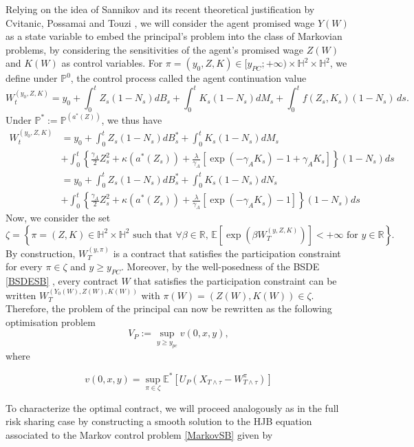 \documentclass[numbook, envcountsect, envcountsame, envcountreset, runningheads, smallextended]{article}
\def \E{\mathbb{E}}
\def \P{\mathbb{P}}
\def \R{\mathbb{R}}
\begin{document}
Relying on the idea of Sannikov \cite{Sannikov08} and its recent theoretical justification by Cvitanic, Possamai and Touzi \cite{CPT:18}, we will consider the agent promised wage $Y(W)$ as a state variable to embed the principal’s problem into the class of Markovian problems, by considering the sensitivities of the agent’s promised wage $Z(W)$ and $K(W)$ as control variables. For $\pi=(y_0,Z,K) \in [y_{PC} ; + \infty) \times \mathbb{H}^2 \times  \mathbb{H}^2$, we define
under $\P^0$, the control process called the agent continuation value
\begin{equation}
 \label{eq:wageprocess2}
 W^{(y_0,Z,K)}_t =  y_0 +  \int_0^t Z_s (1-N_s)dB_s + \int_0^ t K_s (1-N_s)dM_s + \int_0^t f(Z_s,K_s)(1-N_s)\, ds.
 \end{equation}
Under $\P^*:=\P^{(a^*(Z))}$, we thus have
\begin{align}\label{eq:wageprocess2bis}
W^{(y_0,Z,K)}_t &=  y_0 +  \int_0^t Z_s(1-N_s) dB_s^* + \int_0^ t K_s(1-N_s) dM_s \\ \nonumber
&+ \int_0^t \left\{ \frac{\gamma_A}{2}   Z_s^2 + \kappa(a^*(Z_s))+ \frac{\lambda}{\gamma_A} [\exp(-\gamma_A K_s) - 1 + \gamma_A K_s ] \right\} (1-N_s)ds \\ \nonumber
&=  y_0 +  \int_0^t Z_s(1-N_s) dB_s^* + \int_0^ t K_s(1-N_s) dN_s \\ 
&+ \int_0^t \left\{ \frac{\gamma_A}{2}   Z_s^2 + \kappa(a^*(Z_s))+ \frac{\lambda}{\gamma_A} [\exp(-\gamma_A K_s) - 1 ] \right\} (1-N_s)ds  \nonumber
\end{align}
Now, we consider the set
$$
\zeta = \left\{ \pi=(Z,K) \in  \mathbb{H}^2 \times  \mathbb{H}^2 \text{ such that } \forall \beta \in \R,\,\E\left[  \exp(\beta W_T^{(y,Z,K)})  \right]<+\infty \text{ for }y \in \R \right\}.
$$
By construction, $W^{(y,\pi)}_{T}$ is a contract  that satisfies the participation constraint for every $\pi \in \zeta$ and $y \ge y_{PC}$. Moreover, by the well-posedness of the BSDE \eqref{BSDESB} , every contract $W$ that satisfies the participation constraint can be written $W^{(Y_0(W),Z(W),K(W))}_{T}$
with $\pi(W)=(Z(W),K(W)) \in \zeta$. Therefore, the problem of the principal can now be rewritten as the following optimisation problem
$$
V_P:=\sup_{y \ge y_{pc}} v(0,x,y),
$$
where

\begin{equation}
\label{MarkovSB}
v(0,x,y)=\sup_{\pi \in \zeta} \E^*\left[U_P(X_{T\wedge\tau}-W_{T\wedge\tau}^\pi) \right]
\end{equation}

To characterize the optimal contract, we will proceed analogously as in the full risk sharing case by constructing a smooth solution to the HJB equation associated to the Markov control problem \eqref{MarkovSB} given by
\end{document}
